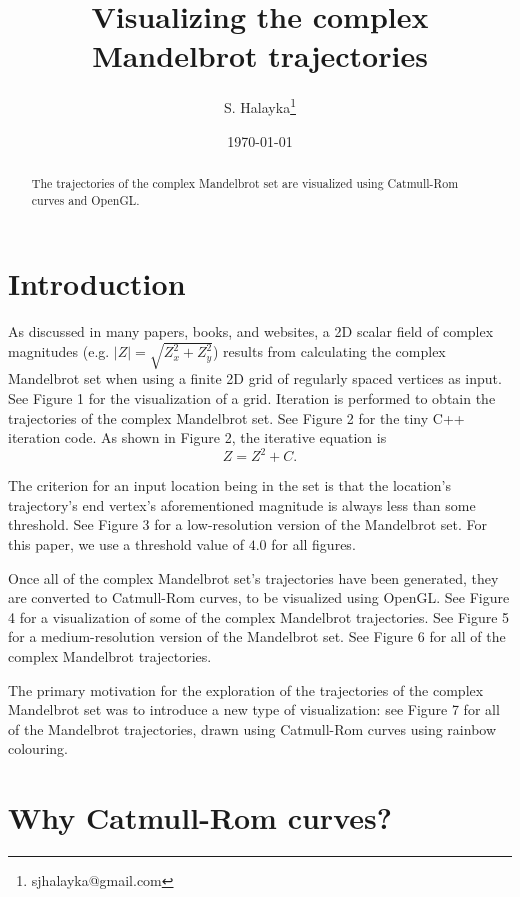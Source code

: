 \documentclass[12pt]{article}
\title{Visualizing the complex Mandelbrot trajectories}
\author{S. Halayka\footnote{sjhalayka@gmail.com}}
\date{\today}
\begin{document}
\maketitle

\begin{abstract}
The trajectories of the complex Mandelbrot set are visualized using Catmull-Rom curves and OpenGL.
\end{abstract}



\section{Introduction}

As discussed in many papers, books, and websites, a 2D scalar field of complex magnitudes (e.g. $|Z| = \sqrt{Z_x^2 + Z_y^2}$) results from calculating the complex Mandelbrot set when using a finite 2D grid of regularly spaced vertices as input.
See Figure 1 for the visualization of a grid.
Iteration is performed to obtain the trajectories of the complex Mandelbrot set.
See Figure 2 for the tiny C++ iteration code.
As shown in Figure 2, the iterative equation is
\begin{equation}
Z = Z^2 + C.
\end{equation}

The criterion for an input location being in the set is that the location's trajectory's end vertex's aforementioned magnitude is always less than some threshold.
See Figure 3 for a low-resolution version of the Mandelbrot set.
For this paper, we use a threshold value of $4.0$ for all figures.

Once all of the complex Mandelbrot set's trajectories have been generated, they are converted to Catmull-Rom curves, to be visualized using OpenGL. 
See Figure 4 for a visualization of some of the complex Mandelbrot trajectories.
See Figure 5 for a medium-resolution version of the Mandelbrot set.
See Figure 6 for all of the complex Mandelbrot trajectories.

The primary motivation for the exploration of the trajectories of the complex Mandelbrot set was to introduce a new type of visualization: see Figure 7 for all of the Mandelbrot trajectories, drawn using Catmull-Rom curves using rainbow colouring.


\section{Why Catmull-Rom curves?}
\end{document}
